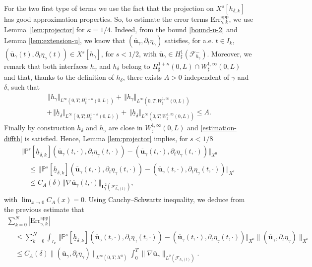 \documentclass[11pt]{article}
\let\mathcal\mathscr
\newcommand{\app}{\mathrm{app}}
\newcommand{\Err}{\mathrm{Err}}
\theoremstyle{remark}
\theoremstyle{definition}
\newcommand{\norme}[1]{\,\Vert #1\Vert}
\newcommand{\ug}{\boldsymbol{u}}
\newcommand{\BS}[1]{\boldsymbol{#1}}
\newcommand{\hb}{{\underline{h}}}
\begin{document}
For the two first type of terms we use the fact that the projection on $X^s[h_{\delta, k}]$ has good approximation properties. So, to estimate the error terms $\Err^{\app}_{\gamma,k}$, we use Lemma~\ref{lem:projector} for $\kappa=1/4$. Indeed, from the bound \eqref{bound-u-2} and Lemma \eqref{lem:extension-u}, we know that $(\overline{\ug}_{\gamma},\partial_t \eta_\gamma)$ satisfies, for a.e. $t \in I_k$, $(\overline{\ug}_{\gamma}(t),\partial_t \eta_{\gamma}(t)) \in X^s[h_{\gamma}]$, for $s<1/2$, with $\overline{\ug}_{\gamma} \in H_\sharp^1(\mathcal F^-_{h_{\gamma}})$. Moreover, we remark that both interfaces $h_{\gamma}$ and $h_\delta$ belong to $H^{1+\kappa}_{\sharp}(0,L) \cap W_\sharp^{1,\infty}(0,L)$ and that, thanks to the definition of $h_\delta$, there exists $A >0$ independent of $\gamma$ and $\delta$, such that\vspace*{-5pt}
\begin{multline*}
\norme{h_{\gamma}}_{L^{\infty}(0,T;H^{1+\kappa}_{\sharp}(0,L))}+\norme{h_{\gamma}}_{L^{\infty}(0,T;W^{1,\infty}_{\sharp}(0,L))} \\
+\norme{\hb_{\delta}}_{L^{\infty}(0,T;H^{1+\kappa}_{\sharp}(0,L))}+\norme{\hb_{\delta}}_{L^{\infty}(0,T;W^{1,\infty}_{\sharp}(0,L))}\leq A.
\end{multline*}
Finally by construction $h_\delta$ and $h_\gamma$ are close in $W^{1, \infty}_\sharp(0, L)$ and \eqref{estimation-diffth} is satisfied.
Hence,
Lemma \ref{lem:projector} implies, for $s<1/8$\vspace*{-3pt}
\begin{multline*}
\norme{\mathbb{P}^{s}[\hb_{\delta, k}](\overline{\ug}_{\gamma}(t,\cdot),\partial_{t}\eta_{\gamma}(t,\cdot)) -(\overline{\ug}_{\gamma}(t,\cdot),\partial_{t}\eta_{\gamma}(t,\cdot))}_{X^0} \\
\begin{aligned}
&\leq\norme{\mathbb{P}^{s}[\hb_{\delta, k}](\overline{\ug}_{\gamma}(t,\cdot),\partial_{t}\eta_{\gamma}(t,\cdot)) -(\overline{\ug}_{\gamma}(t,\cdot),\partial_{t}\eta_{\gamma}(t,\cdot))}_{X^s}\\
&\leq C_{A}(\delta)\norme{\nabla \overline{\ug}_{\gamma}(t,\cdot)}_{\BS{L}^{2}_{\sharp}(\mathcal{F}^{-}_{h_{\gamma}(t)})},
\end{aligned}
\end{multline*}
with $\lim_{x\to 0} C_A(x)=0$.
Using Cauchy--Schwartz inequality, we deduce from the previous estimate that\vspace*{-5pt}
\begin{multline*}
\sum_{k=0}^N |\Err_{\gamma,k}^{\app}| \\[-8pt]
\begin{aligned}
& \leq \sum_{k=0}^N \int_{I_k} \norme{\mathbb{P}^{s}[\hb_{\delta, k}](\overline{\ug}_{\gamma}(t,\cdot),\partial_{t}\eta_{\gamma}(t,\cdot)) -(\overline{\ug}_{\gamma}(t,\cdot),\partial_{t}\eta_{\gamma}(t,\cdot))}_{X^0}
\|(\overline{\ug}_{\gamma},\partial_t \eta_{\gamma})\|_{X^0} \\
& \leq C_A({\delta})\|(\overline{\ug}_{\gamma},\partial_t \eta_{\gamma})\|_{L^\infty(0, T;X^0)} \int_0^T \|\nabla \overline{\ug}_{\gamma}\|_{L^2(\mathcal F_{h_{\gamma}(t)})}.
\end{aligned}
\end{multline*}
\end{document}
